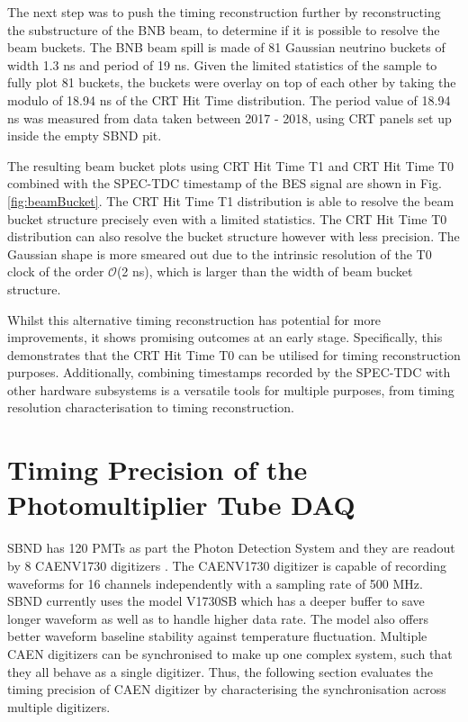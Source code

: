 The next step was to push the timing reconstruction further by reconstructing the substructure of the BNB beam, to determine if it is possible to resolve the beam buckets.
The BNB beam spill is made of 81 Gaussian neutrino buckets of width 1.3 ns and period of 19 ns.
Given the limited statistics of the sample to fully plot 81 buckets, the buckets were overlay on top of each other by taking the modulo of 18.94 ns of the CRT Hit Time distribution.
The period value of 18.94 ns was measured from data taken between 2017 - 2018, using CRT panels set up inside the empty SBND pit.

The resulting beam bucket plots using CRT Hit Time T1 and CRT Hit Time T0 combined with the SPEC-TDC timestamp of the BES signal are shown in Fig. \ref{fig:beamBucket}.
The CRT Hit Time T1 distribution is able to resolve the beam bucket structure precisely even with a limited statistics.
The CRT Hit Time T0 distribution can also resolve the bucket structure however with less precision. 
The Gaussian shape is more smeared out due to the intrinsic resolution of the T0 clock of the order $\mathcal{O}$(2 ns), which is larger than the width of beam bucket structure.

Whilst this alternative timing reconstruction has potential for more improvements, it shows promising outcomes at an early stage.
Specifically, this demonstrates that the CRT Hit Time T0 can be utilised for timing reconstruction purposes. 
Additionally, combining timestamps recorded by the SPEC-TDC with other hardware subsystems is a versatile tools for multiple purposes, from timing resolution characterisation to timing reconstruction.

\section{Timing Precision of the Photomultiplier Tube DAQ}
\label{section5.4}

SBND has 120 PMTs as part the Photon Detection System and they are readout by 8 CAENV1730 digitizers \cite{caen_manuals}.
The CAENV1730 digitizer is capable of recording waveforms for 16 channels independently with a sampling rate of 500 MHz.
SBND currently uses the model V1730SB which has a deeper buffer to save longer waveform as well as to handle higher data rate.
The model also offers better waveform baseline stability against temperature fluctuation.
Multiple CAEN digitizers can be synchronised to make up one complex system, such that they all behave as a single digitizer.
Thus, the following section evaluates the timing precision of CAEN digitizer by characterising the synchronisation across multiple digitizers.

